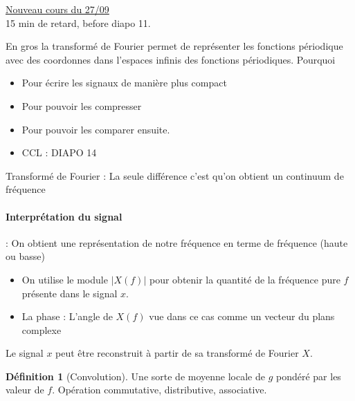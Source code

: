 \documentclass{article}
\theoremstyle{plain}%
\theoremstyle{definition}
\newtheorem{defn}{Définition}[section]
\theoremstyle{remark}
\begin{document}
\underline{Nouveau cours du 27/09} \\
15 min de retard, before diapo 11. 

En gros la transformé de Fourier permet de représenter les fonctions périodique avec des coordonnes dans l'espaces infinis des fonctions périodiques. Pourquoi \begin{itemize}
    \item Pour écrire les signaux de manière plus compact
    \item Pour pouvoir les compresser
    \item Pour pouvoir les comparer ensuite. 
    \item CCL : DIAPO 14 
\end{itemize}

Transformé de Fourier : La seule différence c'est qu'on obtient un continuum de fréquence 

\paragraph*{Interprétation du signal} : On obtient une représentation de notre fréquence en terme de fréquence (haute ou basse)\begin{itemize}
    \item On utilise le module $ \left| X(f) \right|  $ pour obtenir la quantité de la fréquence pure $ f $ présente dans le signal $ x $.
    \item La phase : L'angle de $ X(f) $ vue dans ce cas comme un vecteur du plans complexe
\end{itemize}
Le signal $ x $ peut être reconstruit à partir de sa transformé de Fourier $ X $. 

\begin{defn}[Convolution]
    Une sorte de moyenne locale de $ g $ pondéré par les valeur de $ f $. Opération commutative, distributive, associative.
\end{defn}
\end{document}
